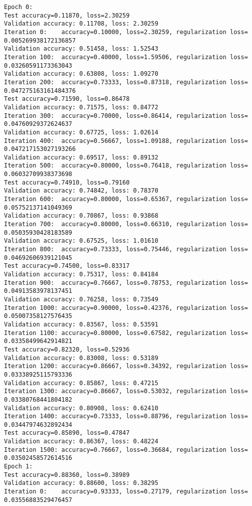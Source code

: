 \documentclass[11pt]{article}
\begin{document}
    \begin{Verbatim}[commandchars=\\\{\}]
Epoch 0: 
Test accuracy=0.11870, loss=2.30259
Validation accuracy: 0.11708, loss: 2.30259
Iteration 0:	accuracy=0.10000, loss=2.30259, regularization loss= 0.005269938172136857
Validation accuracy: 0.51458, loss: 1.52543
Iteration 100:	accuracy=0.40000, loss=1.59506, regularization loss= 0.03260591173363043
Validation accuracy: 0.63808, loss: 1.09270
Iteration 200:	accuracy=0.73333, loss=0.87318, regularization loss= 0.047275163161484376
Test accuracy=0.71590, loss=0.86478
Validation accuracy: 0.71575, loss: 0.84772
Iteration 300:	accuracy=0.70000, loss=0.86414, regularization loss= 0.04760929372624637
Validation accuracy: 0.67725, loss: 1.02614
Iteration 400:	accuracy=0.56667, loss=1.09188, regularization loss= 0.047217153027193266
Validation accuracy: 0.69517, loss: 0.89132
Iteration 500:	accuracy=0.80000, loss=0.76418, regularization loss= 0.06032709938373698
Test accuracy=0.74910, loss=0.79160
Validation accuracy: 0.74842, loss: 0.78370
Iteration 600:	accuracy=0.80000, loss=0.65367, regularization loss= 0.05752137141049369
Validation accuracy: 0.70867, loss: 0.93868
Iteration 700:	accuracy=0.80000, loss=0.66310, regularization loss= 0.05035930428183589
Validation accuracy: 0.67525, loss: 1.01610
Iteration 800:	accuracy=0.73333, loss=0.75446, regularization loss= 0.04692606939121045
Test accuracy=0.74500, loss=0.83317
Validation accuracy: 0.75317, loss: 0.84184
Iteration 900:	accuracy=0.76667, loss=0.78753, regularization loss= 0.04913583978137451
Validation accuracy: 0.76258, loss: 0.73549
Iteration 1000:	accuracy=0.90000, loss=0.42376, regularization loss= 0.05007358127576435
Validation accuracy: 0.83567, loss: 0.53591
Iteration 1100:	accuracy=0.80000, loss=0.67582, regularization loss= 0.03358499642914821
Test accuracy=0.82320, loss=0.52936
Validation accuracy: 0.83008, loss: 0.53189
Iteration 1200:	accuracy=0.86667, loss=0.34392, regularization loss= 0.03338925115793336
Validation accuracy: 0.85867, loss: 0.47215
Iteration 1300:	accuracy=0.86667, loss=0.53032, regularization loss= 0.03380768441804182
Validation accuracy: 0.80908, loss: 0.62410
Iteration 1400:	accuracy=0.73333, loss=0.88796, regularization loss= 0.03447974632892434
Test accuracy=0.85890, loss=0.47847
Validation accuracy: 0.86367, loss: 0.48224
Iteration 1500:	accuracy=0.76667, loss=0.36684, regularization loss= 0.03502458572614516
Epoch 1: 
Test accuracy=0.88360, loss=0.38989
Validation accuracy: 0.88600, loss: 0.38295
Iteration 0:	accuracy=0.93333, loss=0.27179, regularization loss= 0.03556883529476457

\end{Verbatim}
\end{document}
